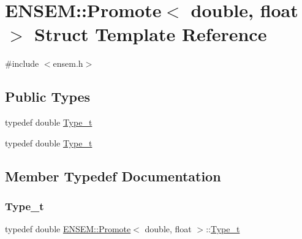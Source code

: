 \hypertarget{structENSEM_1_1Promote_3_01double_00_01float_01_4}{}\section{E\+N\+S\+EM\+:\+:Promote$<$ double, float $>$ Struct Template Reference}
\label{structENSEM_1_1Promote_3_01double_00_01float_01_4}


{\ttfamily \#include $<$ensem.\+h$>$}

\subsection*{Public Types}
\begin{DoxyCompactItemize}
\item 
typedef double \mbox{\hyperlink{structENSEM_1_1Promote_3_01double_00_01float_01_4_a28b4d03d3f730b8dcd68ae2c895ea119}{Type\+\_\+t}}
\item 
typedef double \mbox{\hyperlink{structENSEM_1_1Promote_3_01double_00_01float_01_4_a28b4d03d3f730b8dcd68ae2c895ea119}{Type\+\_\+t}}
\end{DoxyCompactItemize}


\subsection{Member Typedef Documentation}
\mbox{\label{structENSEM_1_1Promote_3_01double_00_01float_01_4_a28b4d03d3f730b8dcd68ae2c895ea119}} 
\subsubsection{\texorpdfstring{Type\_t}{Type\_t}\hspace{0.1cm}{\footnotesize\ttfamily [1/2]}}
{\footnotesize\ttfamily typedef double \mbox{\hyperlink{structENSEM_1_1Promote}{E\+N\+S\+E\+M\+::\+Promote}}$<$ double, float $>$\+::\mbox{\hyperlink{structENSEM_1_1Promote_3_01double_00_01float_01_4_a28b4d03d3f730b8dcd68ae2c895ea119}{Type\+\_\+t}}}

\mbox{\label{structENSEM_1_1Promote_3_01double_00_01float_01_4_a28b4d03d3f730b8dcd68ae2c895ea119}} 
